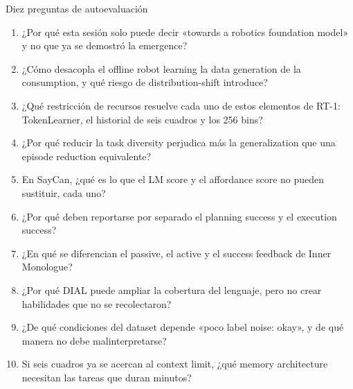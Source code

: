 \documentclass[a4paper]{article}
\begin{document}
\begin{importantbox}{Diez preguntas de autoevaluación}
\begin{enumerate}
  \item ¿Por qué esta sesión solo puede decir «towards a robotics foundation model» y no que ya se demostró la emergence?
  \item ¿Cómo desacopla el offline robot learning la data generation de la consumption, y qué riesgo de distribution-shift introduce?
  \item ¿Qué restricción de recursos resuelve cada uno de estos elementos de RT-1: TokenLearner, el historial de seis cuadros y los 256 bins?
  \item ¿Por qué reducir la task diversity perjudica más la generalization que una episode reduction equivalente?
  \item En SayCan, ¿qué es lo que el LM score y el affordance score no pueden sustituir, cada uno?
  \item ¿Por qué deben reportarse por separado el planning success y el execution success?
  \item ¿En qué se diferencian el passive, el active y el success feedback de Inner Monologue?
  \item ¿Por qué DIAL puede ampliar la cobertura del lenguaje, pero no crear habilidades que no se recolectaron?
  \item ¿De qué condiciones del dataset depende «poco label noise: okay», y de qué manera no debe malinterpretarse?
  \item Si seis cuadros ya se acercan al context limit, ¿qué memory architecture necesitan las tareas que duran minutos?
\end{enumerate}
\end{importantbox}
\end{document}

